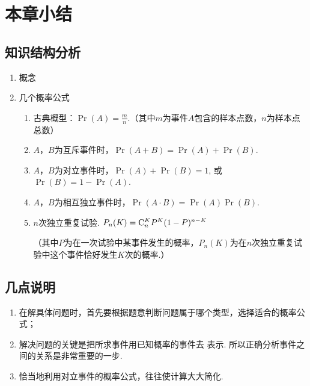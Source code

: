 \section{本章小结}
\subsection*{知识结构分析}
\begin{enumerate}
    \item 概念
\begin{center}
\end{center}

    \item 几个概率公式
\begin{enumerate}[(1)]
\item 古典概型：$\Pr(A)=\frac{m}{n}$.（其中$m$为事件$A$包含的样本点数，$n$为样本点总数）
\item $A$，$B$为互斥事件时，$\Pr(A+B)=\Pr(A)+\Pr(B)$.
\item $A$，$B$为对立事件时，$\Pr(A)+\Pr(B)=1$,
或$\Pr(B)=1-\Pr(A)$.
\item $A$，$B$为相互独立事件时，$\Pr(A\cdot B)=\Pr(A)\Pr(B)$.
\item $n$次独立重复试验. $P_n(K)={\rm C}^K_n P^K (1-P)^{n-K}$

（其中$P$为在一次试验中某事件发生的概率，$P_n(K)$为在$n$次独立重复试验中这个事件恰好发生$K$次的概率.）
\end{enumerate}
\end{enumerate}

\subsection{几点说明}
\begin{enumerate}
\item 在解具体问题时，首先要根据题意判断问题属于哪个类型，选择适合的概率公式；
\item 解决问题的关键是把所求事件用已知概率的事件去
表示. 所以正确分析事件之间的关系是非常重要的一步.
\item 恰当地利用对立事件的概率公式，往往使计算大大简化.
\end{enumerate}


